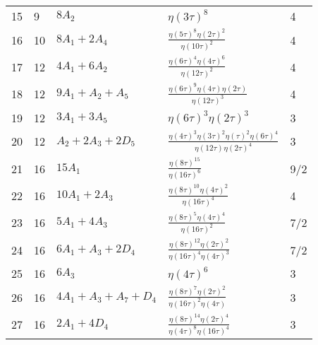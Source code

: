 \documentclass{amsart}
\theoremstyle{definition}
\begin{document}
\begin{longtable}{|l|l|l|l|l|}
  15 & 9 & $8 A_{2}$ & $ \eta \left( 3\tau \right)   ^{8}$ & 4 \\ 
  16 & 10 & $8 A_{1} + 2 A_{4}$ & ${\frac {  \eta \left( 5\tau \right)   ^{8}  \eta \left( 2\tau \right)   ^{2}}{  \eta \left( 10\tau \right)   ^{2}}}$ & 4 \\ 
  17 & 12 & $4 A_{1} + 6 A_{2}$ & ${\frac {  \eta \left( 6\tau \right)   ^{4}  \eta \left( 4\tau \right)   ^{6}}{  \eta \left( 12\tau \right)   ^{2}}}$ & 4 \\ 
  18 & 12 & $9 A_{1} +  A_{2} +  A_{5}$ & ${\frac {  \eta \left( 6\tau \right)   ^{9}\eta \left( 4\tau \right) \eta \left( 2\tau \right) }{  \eta \left( 12\tau \right)   ^{3}}}$ & 4 \\ 
  19 & 12 & $3 A_{1} + 3 A_{5}$ & $ \eta \left( 6\tau \right)   ^{3}  \eta \left( 2\tau \right)   ^{3}$ & 3 \\ 
  20 & 12 & $ A_{2} + 2 A_{3} + 2 D_{5}$ & ${\frac {  \eta \left( 4\tau \right)   ^{3}  \eta \left( 3\tau \right)   ^{2}  \eta \left( \tau \right)   ^{2} \mbox{}  \eta \left( 6\tau \right)   ^{4}}{\eta \left( 12\tau \right)   \eta \left( 2\tau \right)   ^{4}}}$ & 3 \\ 
  21 & 16 & $15 A_{1}$ & ${\frac {  \eta \left( 8\tau \right)   ^{15}}{  \eta \left( 16\tau \right)   ^{6}}}$ & 9/2 \\ 
  22 & 16 & $10 A_{1} + 2 A_{3}$ & ${\frac {  \eta \left( 8\tau \right)   ^{10}  \eta \left( 4\tau \right)   ^{2}}{  \eta \left( 16\tau \right)   ^{4}}}$ & 4 \\ 
  23 & 16 & $5 A_{1} + 4 A_{3}$ & ${\frac {  \eta \left( 8\tau \right)   ^{5}  \eta \left( 4\tau \right)   ^{4}}{  \eta \left( 16\tau \right)   ^{2}}}$ & 7/2 \\ 
  24 & 16 & $6 A_{1} +  A_{3} + 2 D_{4}$ & ${\frac {  \eta \left( 8\tau \right)   ^{12}  \eta \left( 2\tau \right)   ^{2}}{  \eta \left( 16\tau \right)   ^{4} \mbox{}  \eta \left( 4\tau \right)   ^{3}}}$ & 7/2 \\ 
  25 & 16 & $6 A_{3}$ & $ \eta \left( 4\tau \right)   ^{6}$ & 3 \\ 
  26 & 16 & $4 A_{1} +  A_{3} +  A_{7} +  D_{4}$ & ${\frac {  \eta \left( 8\tau \right)   ^{7}  \eta \left( 2\tau \right)   ^{2}}{  \eta \left( 16\tau \right)   ^{2} \mbox{}\eta \left( 4\tau \right) }}$ & 3 \\ 
  27 & 16 & $2 A_{1} + 4 D_{4}$ & ${\frac {  \eta \left( 8\tau \right)   ^{14}  \eta \left( 2\tau \right)   ^{4}}{  \eta \left( 4\tau \right)   ^{8} \mbox{}  \eta \left( 16\tau \right)   ^{4}}}$ & 3 \\ 

\end{longtable}
\end{document}
